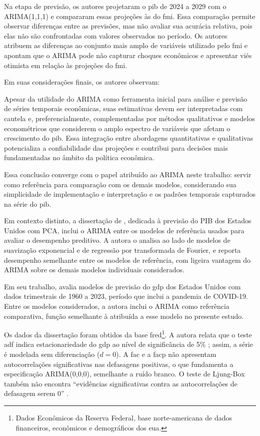 Na etapa de previsão, os autores projetaram o \ac{pib} de 2024 a 2029 com o ARIMA(1,1,1) e compararam essas projeções às do \ac{fmi}. Essa comparação permite observar diferenças entre as previsões, mas não avaliar sua acurácia relativa, pois elas não são confrontadas com valores observados no período. Os autores atribuem as diferenças ao conjunto mais amplo de variáveis utilizado pelo \ac{fmi} e apontam que o ARIMA pode não capturar choques econômicos e apresentar viés otimista em relação às projeções do \ac{fmi}.

Em suas considerações finais, os autores observam:

\begin{citacao}
	Apesar da utilidade do ARIMA como ferramenta inicial para análise e previsão de séries temporais econômicas, suas estimativas devem ser interpretadas com cautela e, preferencialmente, complementadas por métodos qualitativos e modelos econométricos que considerem o amplo espectro de variáveis que afetam o crescimento do \ac{pib}. Essa integração entre abordagens quantitativas e qualitativas potencializa a confiabilidade das projeções e contribui para decisões mais fundamentadas no âmbito da política econômica. 
\end{citacao}

Essa conclusão converge com o papel atribuído ao ARIMA neste trabalho: servir como referência para comparação com os demais modelos, considerando sua simplicidade de implementação e interpretação e os padrões temporais capturados na série do \ac{pib}.

Em contexto distinto, a dissertação de , dedicada à previsão do PIB dos Estados Unidos com PCA, inclui o ARIMA entre os modelos de referência usados para avaliar o desempenho preditivo. A autora o analisa ao lado de modelos de suavização exponencial e de regressão por transformada de Fourier, e reporta desempenho semelhante entre os modelos de referência, com ligeira vantagem do ARIMA sobre os demais modelos individuais considerados.

Em seu trabalho,  avalia modelos de previsão do \ac{gdp} dos Estados Unidos com dados trimestrais de 1960 a 2023, período que inclui a pandemia de COVID-19. Entre os modelos considerados, a autora inclui o ARIMA como referência comparativa, função semelhante à atribuída a esse modelo no presente estudo.

Os dados da dissertação foram obtidos da base \ac{fred}\footnote{Dados Econômicos da Reserva Federal, base norte-americana de dados financeiros, econômicos e demográficos dos \ac{eua}.}. A autora relata que o teste \ac{adf} indica estacionariedade do \ac{gdp} ao nível de significância de 5\% ; assim, a série é modelada sem diferenciação ($d=0$). A \ac{fac} e a \ac{facp} não apresentam autocorrelações significativas nas defasagens positivas, o que fundamenta a especificação ARIMA(0,0,0), semelhante a ruído branco. O teste de Ljung-Box também não encontra “evidências significativas contra as autocorrelações de defasagem serem 0” .

